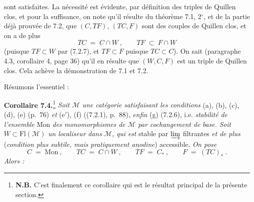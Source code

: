 \documentclass[11pt]{article}
\newcommand{\printedpage}[1]{\marginpar{\footnotesize p.~#1}}
\newcommand{\msp}[1]{\marginpar{\footnotesize [#1]}}
\newcommand{\Mon}{\mathrm{Mon}}
\newcommand{\Fl}{\mathrm{Fl}}
\begin{document}
\printedpage{54}
sont satisfaites. La nécessité est évidente, par définition des triples de Quillen clos, et pour la suffisance, on note qu'il résulte du théorème 7.1, 2$^\circ$, et de la partie déjà prouvée de 7.2, que $(C,TF)$, $(TC,F)$ sont des couples de Quillen clos, et on a de plus
\[
TC \;=\; C\cap W\ , \qquad TF \;\subset\; F\cap W
\]
(puisque $TF\subset W$ par (7.2.7), et $TF\subset F$ puisque $TC\subset C$). On sait
\msp{page 98}
(paragraphe 4.3, corollaire 4, page 36) qu'il en résulte que $(W,C,F)$ est un triple de Quillen clos. Cela achève la démonstration de 7.1 et 7.2.

Résumons l'essentiel :

\textbf{Corollaire 7.4.}\footnote[35]{\textbf{N.B.} C'est finalement ce corollaire qui est le résultat principal de la présente section.} \textit{Soit $\mathcal{M}$ une catégorie satisfaisant les conditions} (a), (b), (c), (d), (e) (p.~76) \textit{et} (e$'$), (f) ((7.2.1), p.~88), \textit{enfin} (g) (7.2.6), i.e. \textit{stabilité de l'ensemble} Mon \textit{des monomorphismes de $\mathcal{M}$ par cochangement de base. Soit $W\subset \Fl(\mathcal{M})$ un localiseur dans $\mathcal{M}$, qui est} stable par $\varinjlim$ filtrantes \textit{et de plus} (\textit{condition plus subtile, mais pratiquement anodine}) accessible. \textit{On pose}
\[
C \;=\; \Mon\ , \qquad TC \;=\; C\cap W\ , \qquad TF \;=\; C_*\ , \qquad F \;=\; (TC)_*\ .
\]
\textit{Alors :}
\end{document}
